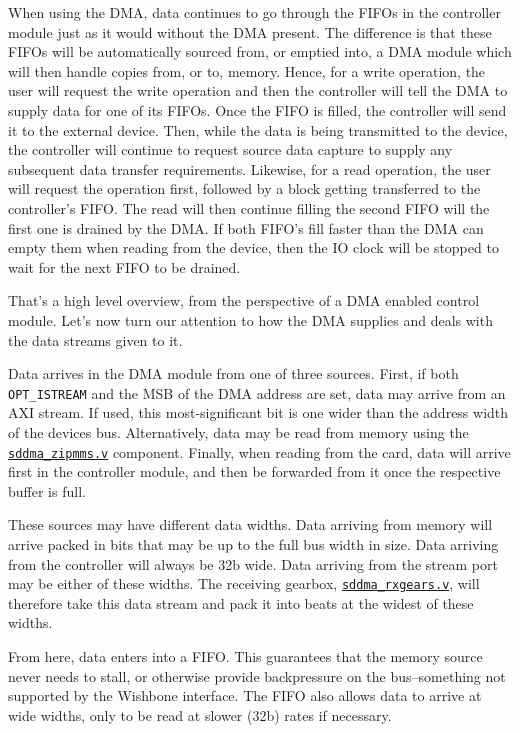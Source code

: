 \documentclass{gqtekspec}
\newcommand{\zhref}[2]{\href{#1}{\textcolor{dkblue}{#2}}}
\begin{document}
When using the DMA, data continues to go through the FIFOs in the controller
module just as it would without the DMA present.  The difference is that these
FIFOs will be automatically sourced from, or emptied into, a DMA module which
will then handle copies
from, or to, memory.  Hence, for a write operation, the user will request
the write operation and then the controller will tell the DMA to supply data
for one of its FIFOs.  Once the FIFO is filled, the controller will send it
to the external device.  Then, while the data is being transmitted to the
device, the controller will continue to request source data capture to supply
any subsequent data transfer requirements.  Likewise, for a read operation,
the user will request the operation first, followed by a block getting
transferred to the controller's FIFO.  The read will then continue filling
the second FIFO will the first one is drained by the DMA.  If both FIFO's
fill faster than the DMA can empty them when reading from the device, then
the IO clock will be stopped to wait for the next FIFO to be drained.

That's a high level overview, from the perspective of a DMA enabled control
module.  Let's now turn our attention to how the DMA supplies and deals
with the data streams given to it.

Data arrives in the DMA module from one of three sources.  First, if
both {\tt OPT\_ISTREAM} and the MSB of the DMA address are set, data may
arrive from an AXI stream.  If used, this most-significant bit is one wider
than the address width of the devices bus.  Alternatively, data may be read
from memory using the \zhref{../rtl/sddma\_zipmms.v}{\tt sddma\_zipmms.v}
component.  Finally, when reading from the card, data will arrive first in the
controller module, and then be forwarded from it once the respective buffer
is full.

These sources may have different data widths.  Data arriving from memory will
arrive packed in bits that may be up to the full bus width in size.  Data
arriving from the controller will always be 32b wide.  Data arriving from the
stream port may be either of these widths.  The receiving gearbox,
\zhref{../rtl/sddma\_rxgears.v}{\tt sddma\_rxgears.v}, will therefore take this
data stream and pack it into beats at the widest of these widths.

From here, data enters into a FIFO.  This guarantees that the memory source
never needs to stall, or otherwise provide backpressure on the bus--something
not supported by the Wishbone interface.  The FIFO also allows data to arrive
at wide widths, only to be read at slower (32b) rates if necessary.
\end{document}
